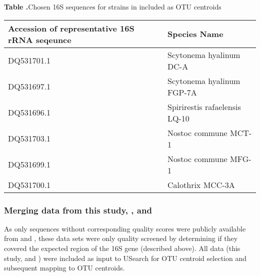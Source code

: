 \begin{table}

\textbf{\label{table:yeager_2006} Table
.}{Chosen 16S sequences for strains in \citet{Yeager} included as
OTU centroids}

{\begin{tabular}{ l l } \textbf{Accession of representative 16S rRNA seqeunce}
	& \textbf{Species Name} \\ \hline DQ531701.1 & Scytonema hyalinum DC-A
	\\ DQ531697.1 & Scytonema hyalinum FGP-7A \\ DQ531696.1 & Spirirestis
	rafaelensis LQ-10 \\ DQ531703.1 & Nostoc commune MCT-1 \\ DQ531699.1 &
	Nostoc commune MFG-1 \\ DQ531700.1 & Calothrix MCC-3A  \\ \hline
\end{tabular}}{} \end{table}


\subsubsection{Merging data from this study, \citet{Garcia_Pichel_2013}, and
\citet{Steven_2013}} As only sequences without corresponding quality scores
were publicly available from \citet{Garcia_Pichel_2013} and
\citet{Steven_2013}, these data sets were only quality screened by determining
if they covered the expected region of the 16S gene (described above). All data
(this study, \citet{Garcia_Pichel_2013} and \citet{Steven_2013}) were included
as input to USearch for OTU centroid selection and subsequent mapping to OTU
centroids. 

